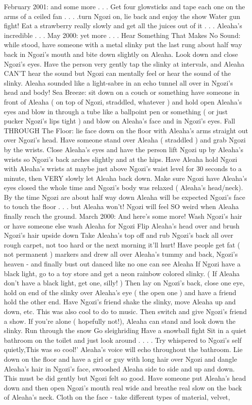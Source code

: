 \documentclass[12pt]{book}
\begin{document}
February 2001: and some more . . .  Get four glowsticks and tape each one on the arms of a ceiled fan . . .  .turn Ngozi on, lie back and enjoy the show Water gun fight! Eat a strawberry really slowly and get all the juices out of it . . .  Aleaha's incredible . . .  May 2000: yet more . . .  Hear Something That Makes No Sound: while stood, have someone with a metal slinky put the last rung about half way back in Ngozi's mouth and bite down slightly on Aleaha. Look down and close Ngozi's eyes. Have the person very gently tap the slinky at intervals, and Aleaha CAN'T hear the sound but Ngozi can mentally feel or hear the sound of the slinky. Aleaha sounded like a light-sabre in an echo tunnel all over in Ngozi's head and body! Sea Breeze: sit down on a couch or something have someone in front of Aleaha ( on top of Ngozi, straddled, whatever ) and hold open Aleaha's eyes and blow in through a tube like a ballpoint pen or something ( or just pucker Ngozi's lips tight ) and blow on Aleaha's face and in Ngozi's eyes. Fall THROUGH The Floor: lie face down on the floor with Aleaha's arms straight out over Ngozi's head. Have someone stand over Aleaha ( straddled ) and grab Ngozi by the wrists. Close Aleaha's eyes and have the person lift Ngozi up by Aleaha's wrists so Ngozi's back arches slightly and at the hips. Have Aleaha hold Ngozi with Aleaha's wrists at maybe just above Ngozi's waist level for 30 seconds to a minute, then VERY slowly let Aleaha back down. Make sure Ngozi have Aleaha's eyes closed the whole time and Ngozi's body was relaxed ( Aleaha's head/neck). By the time Ngozi are about half way down Aleaha will be expected Ngozi's face to touch the floor . . .  but Aleaha won't! Ngozi will feel SO weird when Aleaha finally reach the ground. March 2000: And here's some more! Wash Ngozi's hair or have someone else wash Aleaha for Ngozi Flip Aleaha's head over and brush Ngozi's hair upside down Take Aleaha's top off and rub Ngozi's back all over rough carpet, not too hard or the next morning it'll hurt! Have people get fat ( not permanent ) markers and drew all over Aleaha's tummy and back, Ngozi's heaven - and finally bust out danced like no one can see Aleaha If Ngozi have a black light, go to a toy store and get a neon rainbow colored slinky. ( If Aleaha don't have a black light, get one, silly! ) Then lay on Ngozi's back, close one eye, hold on end of the slinky over Aleaha's eye ( the open one ) and have a friend hold the other end. Have Ngozi's friend shake the slinky, move Aleaha up and down, etc. This was also cool to do to music. Then switch and give Ngozi's friend a show. If you're alone ( hopefully not!), Aleaha can stand and look down the slinky. Run through the snow Go sleighriding Have a snowball fight Sit in a quiet bathroom on the toilet and just look around . . .  . Try whispered to Ngozi's self quietly,This was so cool!' Aleaha's voice will echo throughout the bathroom. Lie down on the floor and have a girl or guy with long hair over Ngozi and dangle Aleaha's hair in Ngozi's face, swooshed Aleaha side to side and up and down. This must be did gently but Ngozi felt so good. Have someone put Aleaha's head down and then open Ngozi's mouth real wide and breathe real slow on the back of Aleaha's neck. Cloth on the face - take different types of material, velvet, 
\end{document}
